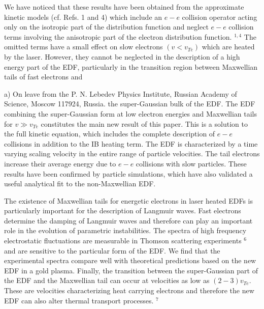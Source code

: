 \documentclass[10pt]{article}
\begin{document}
We have noticed that these results have been obtained from the approximate kinetic models (cf. Refs. 1 and 4) which include an $e-e$ collision operator acting only on the isotropic part of the distribution function and neglect $e-e$ collision terms involving the anisotropic part of the electron distribution function. ${ }^{1,4}$ The omitted terms have a small effect on slow electrons $\left(v<v_{T e}\right)$ which are heated by the laser. However, they cannot be neglected in the description of a high energy part of the EDF, particularly in the transition region between Maxwellian tails of fast electrons and

a) On leave from the P. N. Lebedev Physics Institute, Russian Academy of Science, Moscow 117924, Russia. the super-Gaussian bulk of the EDF. The EDF combining the super-Gaussian form at low electron energies and Maxwellian tails for $v \gg v_{T e}$ constitutes the main new result of this paper. This is a solution to the full kinetic equation, which includes the complete description of $e-e$ collisions in addition to the IB heating term. The EDF is characterized by a time varying scaling velocity in the entire range of particle velocities. The tail electrons increase their average energy due to $e-e$ collisions with slow particles. These results have been confirmed by particle simulations, which have also validated a useful analytical fit to the non-Maxwellian EDF.

The existence of Maxwellian tails for energetic electrons in laser heated EDFs is particularly important for the description of Langmuir waves. Fast electrons determine the damping of Langmuir waves and therefore can play an important role in the evolution of parametric instabilities. The spectra of high frequency electrostatic fluctuations are measurable in Thomson scattering experiments ${ }^{6}$ and are sensitive to the particular form of the EDF. We find that the experimental spectra compare well with theoretical predictions based on the new EDF in a gold plasma. Finally, the transition between the super-Gaussian part of the EDF and the Maxwellian tail can occur at velocities as low as $(2-3) v_{T e}$. These are velocities characterizing heat carrying electrons and therefore the new EDF can also alter thermal transport processes. ${ }^{7}$
\end{document}
